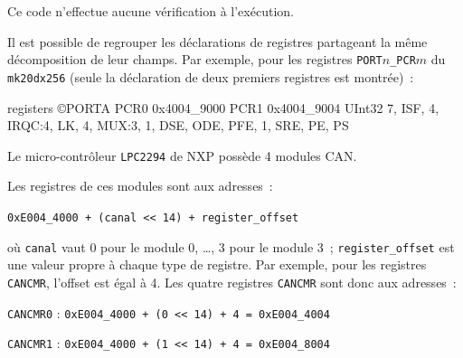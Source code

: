 Ce code n'effectue aucune vérification à l'exécution.

















Il est possible de regrouper les déclarations de registres partageant la même décomposition de leur champs. Par exemple, pour les registres \texttt{PORT$n$\_PCR$m$} du \texttt{mk20dx256} (seule la déclaration de deux premiers registres est montrée)~:

\begin{OMNIBUS}
registers ©PORTA {
  PCR0 0x4004_9000
  PCR1 0x4004_9004
  UInt32 {
    7, ISF, 4, IRQC:4, LK, 4, MUX:3, 1, DSE, ODE, PFE, 1, SRE, PE, PS
  }
}
\end{OMNIBUS}












Le micro-contrôleur \texttt{LPC2294} de NXP possède 4 modules CAN.


Les registres de ces modules sont aux adresses~:

\texttt{0xE004\_4000 + (canal << 14) + register\_offset}

où \texttt{canal} vaut $0$ pour le module $0$, …, $3$ pour le module 3~; \texttt{register\_offset} est une valeur propre à chaque type de registre. Par exemple, pour les registres \texttt{CANCMR}, l'offset est égal à 4. Les quatre registres \texttt{CANCMR} sont donc aux adresses~:

\texttt{CANCMR0} : \texttt{0xE004\_4000 + (0 << 14) + 4 = 0xE004\_4004}

\texttt{CANCMR1} : \texttt{0xE004\_4000 + (1 << 14) + 4 = 0xE004\_8004}

